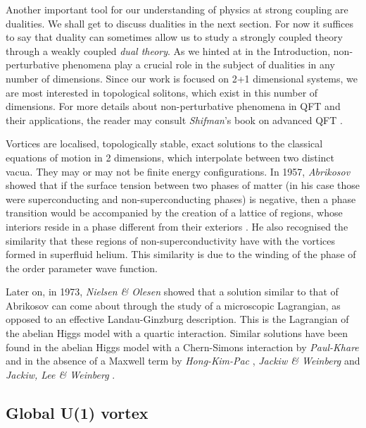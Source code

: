         Another important tool for our understanding of physics at strong coupling are dualities. We shall get to discuss dualities in the next section. For now it suffices to say that duality can sometimes allow us to study a strongly coupled theory through a weakly coupled \textit{dual theory}. As we hinted at in the Introduction, non-perturbative phenomena play a crucial role in the subject of dualities in any number of dimensions. Since our work is focused on 2+1 dimensional systems, we are most interested in topological solitons, which exist in this number of dimensions. For more details about non-perturbative phenomena in QFT and their applications, the reader may consult \textit{Shifman}'s book on advanced QFT \cite{shifman2012}. 
        
        Vortices are localised, topologically stable, exact solutions to the classical equations of motion in 2 dimensions, which interpolate between two distinct vacua.  They may or may not be finite energy configurations.
        In 1957, \textit{Abrikosov}  showed that if the surface tension between two phases of matter (in his case those were superconducting and non-superconducting phases) is negative, then a phase transition would be accompanied by the creation of a lattice of regions, whose interiors reside in a phase different from their exteriors \cite{Abrikosov1957}. He also recognised the similarity that these regions of non-superconductivity have with the vortices formed in superfluid helium. This similarity is due to the winding of the phase of the order parameter wave function.


        Later on, in 1973, \textit{Nielsen \& Olesen} \cite{Nielsen:1973cs} showed that a solution similar to that of Abrikosov can come about through the study of a microscopic Lagrangian, as opposed to an effective Landau-Ginzburg description. This is the Lagrangian of the abelian Higgs model with a quartic interaction. Similar solutions have been found in the abelian Higgs model with a Chern-Simons interaction by \textit{Paul-Khare} \cite{Paul:1986ix} and in the absence of a Maxwell term by \textit{Hong-Kim-Pac} \cite{Hong:1990yh}, \textit{Jackiw \& Weinberg} \cite{Jackiw:1990aw} and \textit{Jackiw, Lee \& Weinberg} \cite{Jackiw:1990pr}.

        \subsection{Global U(1) vortex}

